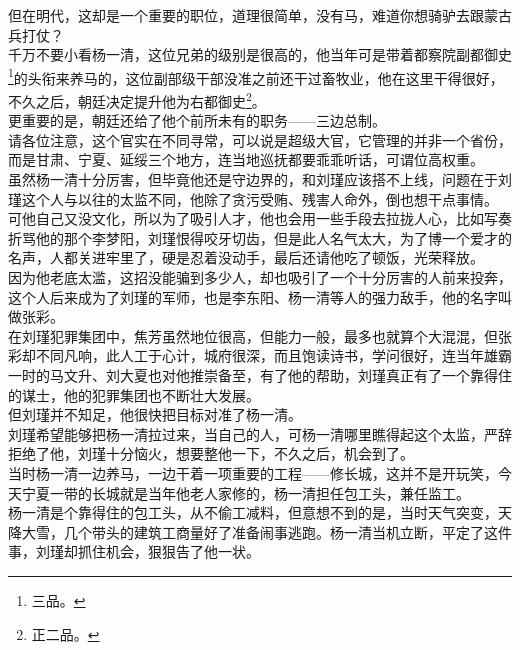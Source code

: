 \begin{multicols}{\theparacolNo}
但在明代，这却是一个重要的职位，道理很简单，没有马，难道你想骑驴去跟蒙古兵打仗？\\

千万不要小看杨一清，这位兄弟的级别是很高的，他当年可是带着都察院副都御史\footnote{三品。}的头衔来养马的，这位副部级干部没准之前还干过畜牧业，他在这里干得很好，不久之后，朝廷决定提升他为右都御史\footnote{正二品。}。\\

更重要的是，朝廷还给了他个前所未有的职务——三边总制。\\

请各位注意，这个官实在不同寻常，可以说是超级大官，它管理的并非一个省份，而是甘肃、宁夏、延绥三个地方，连当地巡抚都要乖乖听话，可谓位高权重。\\

虽然杨一清十分厉害，但毕竟他还是守边界的，和刘瑾应该搭不上线，问题在于刘瑾这个人与以往的太监不同，他除了贪污受贿、残害人命外，倒也想干点事情。\\

可他自己又没文化，所以为了吸引人才，他也会用一些手段去拉拢人心，比如写奏折骂他的那个李梦阳，刘瑾恨得咬牙切齿，但是此人名气太大，为了博一个爱才的名声，人都关进牢里了，硬是忍着没动手，最后还请他吃了顿饭，光荣释放。\\

因为他老底太滥，这招没能骗到多少人，却也吸引了一个十分厉害的人前来投奔，这个人后来成为了刘瑾的军师，也是李东阳、杨一清等人的强力敌手，他的名字叫做张彩。\\

在刘瑾犯罪集团中，焦芳虽然地位很高，但能力一般，最多也就算个大混混，但张彩却不同凡响，此人工于心计，城府很深，而且饱读诗书，学问很好，连当年雄霸一时的马文升、刘大夏也对他推崇备至，有了他的帮助，刘瑾真正有了一个靠得住的谋士，他的犯罪集团也不断壮大发展。\\

但刘瑾并不知足，他很快把目标对准了杨一清。\\

刘瑾希望能够把杨一清拉过来，当自己的人，可杨一清哪里瞧得起这个太监，严辞拒绝了他，刘瑾十分恼火，想要整他一下，不久之后，机会到了。\\

当时杨一清一边养马，一边干着一项重要的工程——修长城，这并不是开玩笑，今天宁夏一带的长城就是当年他老人家修的，杨一清担任包工头，兼任监工。\\

杨一清是个靠得住的包工头，从不偷工减料，但意想不到的是，当时天气突变，天降大雪，几个带头的建筑工商量好了准备闹事逃跑。杨一清当机立断，平定了这件事，刘瑾却抓住机会，狠狠告了他一状。\\


\end{multicols}

